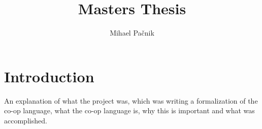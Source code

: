\documentclass[11pt]{article} %
\title{Masters Thesis}
\author{Mihael Pačnik}
\begin{document}
\maketitle

\section{Introduction}
An explanation of what the project was, which was writing a formalization of the co-op language, what the co-op language is, why this is important and what was accomplished.

%
%





\end{document}
